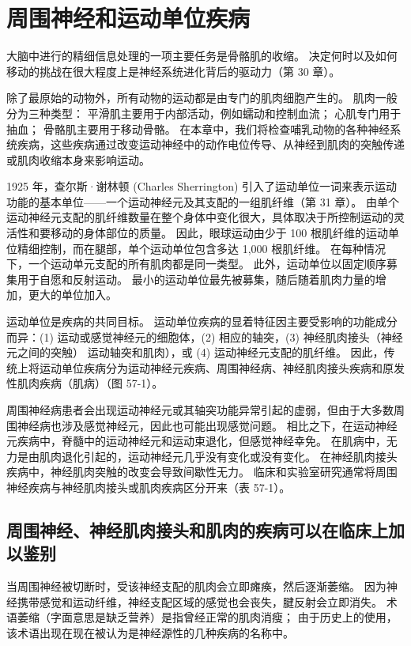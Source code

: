 \chapter{周围神经和运动单位疾病}
大脑中进行的精细信息处理的一项主要任务是骨骼肌的收缩。 决定何时以及如何移动的挑战在很大程度上是神经系统进化背后的驱动力（第 30 章）。

除了最原始的动物外，所有动物的运动都是由专门的肌肉细胞产生的。 肌肉一般分为三种类型： 平滑肌主要用于内部活动，例如蠕动和控制血流； 心肌专门用于抽血； 骨骼肌主要用于移动骨骼。 在本章中，我们将检查哺乳动物的各种神经系统疾病，这些疾病通过改变运动神经中的动作电位传导、从神经到肌肉的突触传递或肌肉收缩本身来影响运动。

1925 年，查尔斯·谢林顿 (Charles Sherrington) 引入了运动单位一词来表示运动功能的基本单位——一个运动神经元及其支配的一组肌纤维（第 31 章）。 由单个运动神经元支配的肌纤维数量在整个身体中变化很大，具体取决于所控制运动的灵活性和要移动的身体部位的质量。 因此，眼球运动由少于 100 根肌纤维的运动单位精细控制，而在腿部，单个运动单位包含多达 1,000 根肌纤维。 在每种情况下，一个运动单元支配的所有肌肉都是同一类型。 此外，运动单位以固定顺序募集用于自愿和反射运动。 最小的运动单位最先被募集，随后随着肌肉力量的增加，更大的单位加入。

运动单位是疾病的共同目标。 运动单位疾病的显着特征因主要受影响的功能成分而异：(1) 运动或感觉神经元的细胞体，(2) 相应的轴突，(3) 神经肌肉接头（神经元之间的突触） 运动轴突和肌肉），或 (4) 运动神经元支配的肌纤维。 因此，传统上将运动单位疾病分为运动神经元疾病、周围神经病、神经肌肉接头疾病和原发性肌肉疾病（肌病）（图 57-1）。

周围神经病患者会出现运动神经元或其轴突功能异常引起的虚弱，但由于大多数周围神经病也涉及感觉神经元，因此也可能出现感觉问题。 相比之下，在运动神经元疾病中，脊髓中的运动神经元和运动束退化，但感觉神经幸免。 在肌病中，无力是由肌肉退化引起的，运动神经元几乎没有变化或没有变化。 在神经肌肉接头疾病中，神经肌肉突触的改变会导致间歇性无力。 临床和实验室研究通常将周围神经疾病与神经肌肉接头或肌肉疾病区分开来（表 57-1）。

\section{周围神经、神经肌肉接头和肌肉的疾病可以在临床上加以鉴别}
当周围神经被切断时，受该神经支配的肌肉会立即瘫痪，然后逐渐萎缩。 因为神经携带感觉和运动纤维，神经支配区域的感觉也会丧失，腱反射会立即消失。 术语萎缩（字面意思是缺乏营养）是指曾经正常的肌肉消瘦； 由于历史上的使用，该术语出现在现在被认为是神经源性的几种疾病的名称中。

